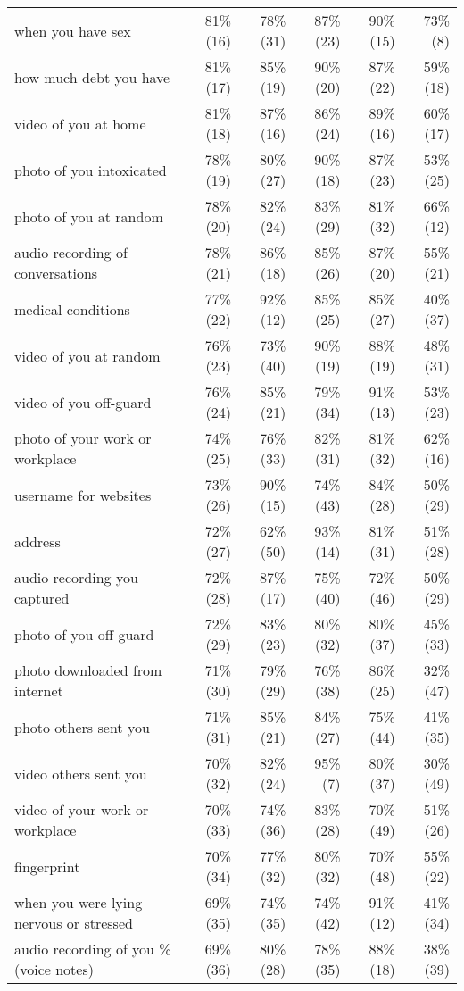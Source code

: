 \begin{table*}[t]
\begin{center}
\begin{tabular}{| l | r | r | r | r | r |}
when you have sex & 81\% (16) & 78\% (31) & 87\% (23) & 90\% (15) & 73\% (8) \\ 
how much debt you have & 81\%(17) & 85\% (19) & 90\% (20) & 87\% (22) & 59\% (18) \\ 
video of you at home & 81\% (18) & 87\% (16) & 86\% (24) & 89\% (16) & 60\% (17) \\ 
photo of you intoxicated & 78\% (19) & 80\% (27) & 90\% (18) & 87\% (23) & 53\% (25) \\ 
photo of you at random  & 78\% (20) & 82\% (24) & 83\% (29) & 81\% (32) & 66\% (12) \\ 
audio recording of conversations & 78\% (21) & 86\% (18) & 85\% (26) & 87\% (20) & 55\% (21) \\ 
medical conditions & 77\% (22) & 92\% (12) & 85\% (25) & 85\% (27) & 40\% (37) \\ 
video of you at random & 76\% (23) & 73\% (40) & 90\% (19) & 88\% (19) & 48\% (31) \\ 
video of you off-guard & 76\% (24) & 85\% (21) & 79\% (34) & 91\% (13) & 53\% (23) \\ 
photo of your work or workplace & 74\% (25) & 76\% (33) & 82\% (31) & 81\% (32) & 62\% (16) \\ 
username for websites & 73\% (26) & 90\% (15) & 74\% (43) & 84\% (28) & 50\% (29) \\ 
address & 72\% (27) & 62\% (50) & 93\% (14) & 81\% (31) & 51\% (28) \\ 
audio recording you captured & 72\% (28) & 87\% (17) & 75\% (40) & 72\% (46) & 50\% (29) \\ 
photo of you off-guard & 72\% (29) & 83\% (23) & 80\% (32) & 80\% (37) & 45\% (33) \\ 
photo downloaded from internet & 71\% (30) & 79\% (29) & 76\% (38) & 86\% (25) & 32\% (47) \\ 
photo others sent you & 71\% (31) & 85\% (21) & 84\% (27) & 75\% (44) & 41\% (35) \\ 
video others sent you & 70\% (32) & 82\% (24) & 95\% (7) & 80\% (37) & 30\% (49) \\ 
video of your work or workplace & 70\% (33) & 74\% (36) & 83\% (28) & 70\% (49) & 51\% (26) \\ 
fingerprint & 70\% (34) & 77\% (32) & 80\% (32) & 70\% (48) & 55\% (22) \\ 
when you were lying nervous or stressed & 69\% (35) & 74\% (35) & 74\% (42) & 91\% (12) & 41\% (34) \\ 
audio recording of you \% (voice notes) & 69\% (36) & 80\% (28) & 78\% (35) & 88\% (18) & 38\% (39) \\ 

\end{tabular}
\end{center}
\end{table*}
